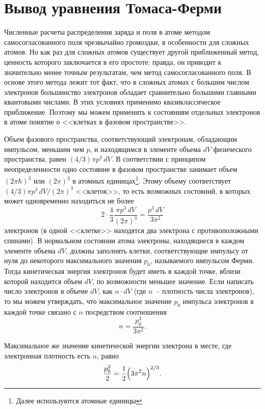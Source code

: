   \section{Вывод уравнения Томаса-Ферми}

  Численные расчеты распределения заряда и поля в атоме методом
  самосогласованного поля чрезвычайно громоздки, в особенности для сложных
  атомов. Но как раз для сложных атомов существует другой приближенный метод,
  ценность которого заключается в его простоте; правда, он приводит к
  значительно менее точным результатам, чем метод самосогласованного поля. В
  основе этого метода лежит тот факт, что в сложных атомах с большим числом
  электронов большинство электронов обладает сравнительно большими главными
  квантовыми числами. В этих условиях применимо квазиклассическое приближение.
  Поэтому мы можем применить к состояниям отдельных электронов в атоме понятие
  о <<клетках в фазовом пространстве>>.

  Объем фазового пространства, соответствующий электронам, обладающим
  импульсом, меньшим чем \( p \), и находящимся в элементе объема \( dV \)
  физического пространства, равен \( (4 / 3)\pi p^3\,dV \). В соответствии с
  принципом неопределенности одно состояние в фазовом пространстве занимает
  объем \( (2\pi\hbar)^3 \) или \( (2\pi)^3 \) в атомных
  единицах\footnote{ Далее используются атомные единицы}. Этому объему
  соответствует \( (4 / 3)\pi p^3\,dV / (2\pi)^3 \) <<клеток>>, то есть
  возможных состояний, в которых может одновременно находиться не более
  \[
    2 \cdot \frac{4}{3}\frac{\pi p^3\,dV}{(2\pi)^3} = \frac{p^3\,dV}{3\pi^2}
  \]
  электронов (в одной <<клетке>> находятся два электрона с противоположными
  спинами). В нормальном состоянии атома электроны, находящиеся в каждом
  элементе объема \( dV \), должны заполнять клетки, соответствующие импульсу
  от нуля до некоторого максимального значения \( p_0 \), называемого
  импульсом Ферми. Тогда кинетическая энергия электронов будет иметь в каждой
  точке, вблизи которой находится объем \( dV \), по возможности меньшее
  значение. Если написать число электронов в объеме \( dV \), как
  \( n\cdot dV \) (где \( n \)~-- плотность числа электронов), то мы можем
  утверждать, что максимальное значение \( p_0 \) импульса электронов в каждой
  точке связано с \( n \) посредством соотношения
  \[
    n = \frac{p_0^3}{3\pi^2}.
  \]

  Максимальное же значение кинетической энергии электрона в месте, где
  электронная плотность есть \( n \), равно
  \begin{equation}
    \frac{p_0^2}{2} = \frac{1}{2} \Bigl(3\pi^2 n\Big)^{2 / 3}.
    \label{eq:1}
  \end{equation}

